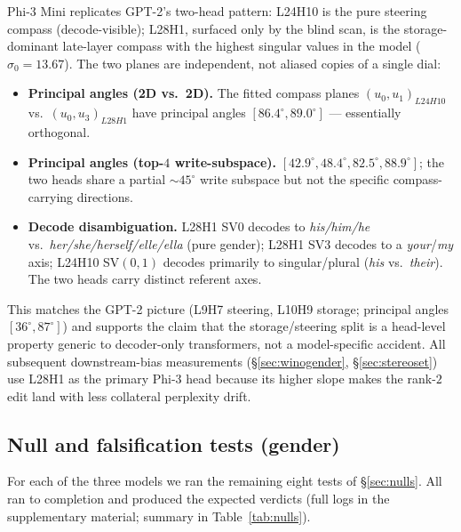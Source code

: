 Phi-3 Mini replicates GPT-2's two-head pattern: L24H10 is the pure
steering compass (decode-visible); L28H1, surfaced only by the blind
scan, is the storage-dominant late-layer compass with the highest
singular values in the model ($\sigma_0 = 13.67$). The two planes are
independent, not aliased copies of a single dial:

\begin{itemize}
    \item \textbf{Principal angles (2D vs.\ 2D).} The fitted compass planes
    $(u_0, u_1)_{L24H10}$ vs.\ $(u_0, u_3)_{L28H1}$ have principal
    angles $[86.4^\circ, 89.0^\circ]$ --- essentially orthogonal.
    \item \textbf{Principal angles (top-$4$ write-subspace).}
    $[42.9^\circ, 48.4^\circ, 82.5^\circ, 88.9^\circ]$; the two heads
    share a partial $\sim 45^\circ$ write subspace but not the
    specific compass-carrying directions.
    \item \textbf{Decode disambiguation.} L28H1 SV$0$ decodes to
    \emph{his/him/he} vs.\ \emph{her/she/herself/elle/ella} (pure
    gender); L28H1 SV$3$ decodes to a \emph{your}/\emph{my} axis;
    L24H10 SV$(0,1)$ decodes primarily to singular/plural
    (\emph{his} vs.\ \emph{their}). The two heads carry distinct
    referent axes.
\end{itemize}

\noindent This matches the GPT-2 picture (L9H7 steering, L10H9 storage;
principal angles $[36^\circ, 87^\circ]$) and supports the claim that
the storage/steering split is a head-level property generic to
decoder-only transformers, not a model-specific accident. All
subsequent downstream-bias measurements (\S\ref{sec:winogender},
\S\ref{sec:stereoset}) use L28H1 as the primary Phi-3 head because
its higher slope makes the rank-$2$ edit land with less collateral
perplexity drift.

\subsection{Null and falsification tests (gender)}

For each of the three models we ran the remaining eight tests of
\S\ref{sec:nulls}. All ran to completion and produced the expected verdicts
(full logs in the supplementary material; summary in
Table~\ref{tab:nulls}).

